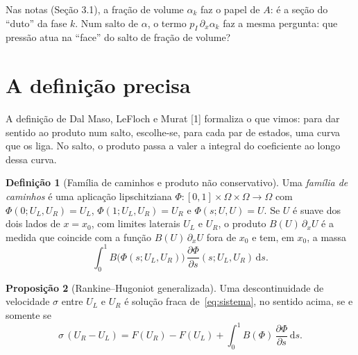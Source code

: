 \documentclass[11pt,a4paper]{article}
\theoremstyle{definition}
\newtheorem{definicao}{Definição}[section]
\newtheorem{proposicao}[definicao]{Proposição}
\theoremstyle{remark}
\newcommand{\pd}[2]{\frac{\partial #1}{\partial #2}}
\newcommand{\dd}{\mathrm{d}}
\begin{document}
Nas notas (Seção 3.1), a fração de volume $\alpha_k$ faz o papel de $A$: é a seção do ``duto'' da fase $k$. Num salto de $\alpha$, o termo $p_I\,\partial_x\alpha_k$ faz a mesma pergunta: que pressão atua na ``face'' do salto de fração de volume?

\section{A definição precisa}

\begin{intuicao}
A definição de Dal Maso, LeFloch e Murat [1] formaliza o que vimos: para dar sentido ao produto num salto, escolhe-se, para cada par de estados, uma curva que os liga. No salto, o produto passa a valer a integral do coeficiente ao longo dessa curva.
\end{intuicao}

\begin{definicao}[Família de caminhos e produto não conservativo]
Uma \emph{família de caminhos} é uma aplicação lipschitziana $\Phi:[0,1]\times\Omega\times\Omega\to\Omega$ com $\Phi(0;U_L,U_R)=U_L$, $\Phi(1;U_L,U_R)=U_R$ e $\Phi(s;U,U)=U$. Se $U$ é suave dos dois lados de $x=x_0$, com limites laterais $U_L$ e $U_R$, o produto $B(U)\,\partial_xU$ é a medida que coincide com a função $B(U)\,\partial_xU$ fora de $x_0$ e tem, em $x_0$, a massa
\[
\int_0^1B\big(\Phi(s;U_L,U_R)\big)\,\pd{\Phi}{s}(s;U_L,U_R)\,\dd s .
\]
\end{definicao}

\begin{proposicao}[Rankine--Hugoniot generalizada]
Uma descontinuidade de velocidade $\sigma$ entre $U_L$ e $U_R$ é solução fraca de~\eqref{eq:sistema}, no sentido acima, se e somente se
\[
\sigma\,(U_R-U_L)=F(U_R)-F(U_L)+\int_0^1B(\Phi)\,\pd{\Phi}{s}\,\dd s .
\]
\end{proposicao}
\end{document}
